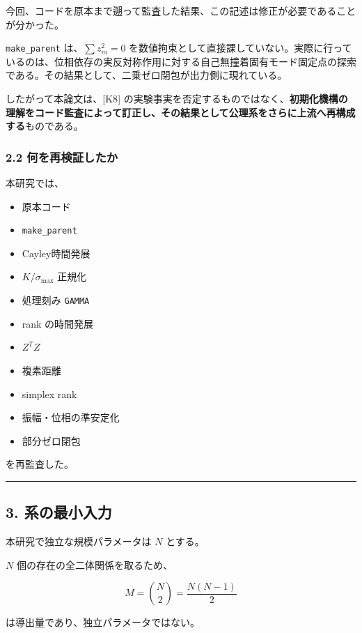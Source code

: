 \documentclass[
  a4paper,
]{ltjsarticle}
\providecommand{\tightlist}{%
  \setlength{\itemsep}{0pt}\setlength{\parskip}{0pt}}
\begin{document}
今回、コードを原本まで遡って監査した結果、この記述は修正が必要であることが分かった。

\texttt{make\_parent} は、\(\sum z_m^2=0\)
を数値拘束として直接課していない。実際に行っているのは、位相依存の実反対称作用に対する自己無撞着固有モード固定点の探索である。その結果として、二乗ゼロ閉包が出力側に現れている。

したがって本論文は、{[}K8{]}
の実験事実を否定するものではなく、\textbf{初期化機構の理解をコード監査によって訂正し、その結果として公理系をさらに上流へ再構成する}ものである。

\subsubsection{2.2
何を再検証したか}\label{ux4f55ux3092ux518dux691cux8a3cux3057ux305fux304b}

本研究では、

\begin{itemize}
\tightlist
\item
  原本コード
\item
  \texttt{make\_parent}
\item
  Cayley時間発展
\item
  \(K/\sigma_{\max}\) 正規化
\item
  処理刻み \texttt{GAMMA}
\item
  rank の時間発展
\item
  \(Z^T Z\)
\item
  複素距離
\item
  simplex rank
\item
  振幅・位相の準安定化
\item
  部分ゼロ閉包
\end{itemize}

を再監査した。

\begin{center}\rule{0.5\linewidth}{0.5pt}\end{center}

\subsection{3. 系の最小入力}\label{ux7cfbux306eux6700ux5c0fux5165ux529b}

本研究で独立な規模パラメータは \(N\) とする。

\(N\) 個の存在の全二体関係を取るため、

\[
M=\binom N2=\frac{N(N-1)}2
\]

は導出量であり、独立パラメータではない。
\end{document}
